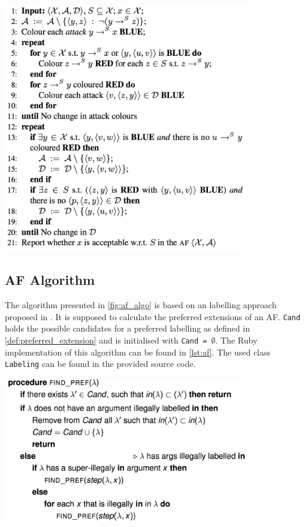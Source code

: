 \begin{algorithm}[!htp]
	\includegraphics[width=0.8\textwidth]{figures/eaf_algorithm}
	\caption{Deciding \gls{EAF} Acceptability of $x \in \X$ \gls{w.r.t.} $S' \subseteq \X$ in $\langle \X, \A, \D \rangle$.}
	\label{fig:eaf_algo}
\end{algorithm}


\subsection{\Gls{AF} Algorithm}
\label{sub:af_algorithm}

The algorithm presented in \cref{fig:af_algo} is based on an labelling approach proposed in \cite{Modgil2009Proof, rodrigues}. It is supposed to calculate the preferred extensions of an \gls{AF}. \texttt{Cand} holds the possible candidates for a preferred labelling as defined in \cref{def:preferred_extension} and is initialised with \texttt{Cand = $\emptyset$}. The Ruby implementation of this algorithm can be found in \cref{lst:af}. The used class \texttt{Labeling} can be found in the provided source code. 

\begin{algorithm}[!htp]
	\includegraphics[width=0.8\textwidth]{figures/af_labelling}
	\caption{Algorithm to compute preferred labelings $\lambda \in $ \texttt{Cand} for \glspl{AF} \cite{rodrigues}.}
	\label{fig:af_algo}
\end{algorithm}



